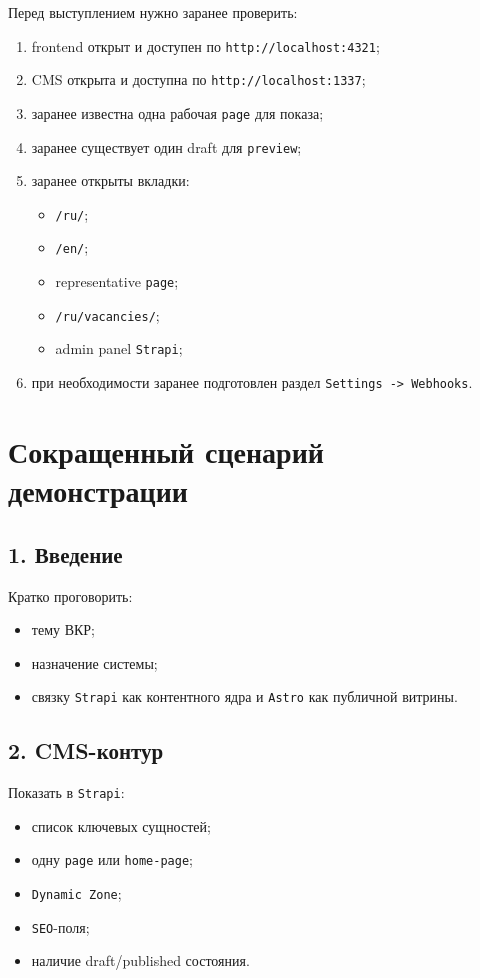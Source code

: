 \documentclass[12pt,a4paper]{article}
\begin{document}
Перед выступлением нужно заранее проверить:
\begin{enumerate}
  \item frontend открыт и доступен по \texttt{http://localhost:4321};
  \item CMS открыта и доступна по \texttt{http://localhost:1337};
  \item заранее известна одна рабочая \texttt{page} для показа;
  \item заранее существует один draft для \texttt{preview};
  \item заранее открыты вкладки:
  \begin{itemize}
    \item \texttt{/ru/};
    \item \texttt{/en/};
    \item representative \texttt{page};
    \item \texttt{/ru/vacancies/};
    \item admin panel \texttt{Strapi};
  \end{itemize}
  \item при необходимости заранее подготовлен раздел \texttt{Settings -> Webhooks}.
\end{enumerate}

\section*{Сокращенный сценарий демонстрации}

\subsection*{1. Введение}

Кратко проговорить:
\begin{itemize}
  \item тему ВКР;
  \item назначение системы;
  \item связку \texttt{Strapi} как контентного ядра и \texttt{Astro} как публичной витрины.
\end{itemize}

\subsection*{2. CMS-контур}

Показать в \texttt{Strapi}:
\begin{itemize}
  \item список ключевых сущностей;
  \item одну \texttt{page} или \texttt{home-page};
  \item \texttt{Dynamic Zone};
  \item \texttt{SEO}-поля;
  \item наличие draft/published состояния.
\end{itemize}
\end{document}
